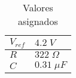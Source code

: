 %
%


\begin{comment}









\blfootnote{\textbf{\textit{Nota: }}Excelente formato de práctica, sin duda.}



\begin{Graphs}[H]
\centering
\texttt{[image: ./images/plotbat.eps]} 
\caption{Símbolo de Batman.}
\label{g1}
\end{Graphs}



\begin{esq}[H]
\centering
\texttt{[image: ./images/1.eps]} 
\caption{Sistema eléctrico procesado en TINA-TI.}
\label{e1}
\end{esq}




\begin{figure}[H]
\centering
\texttt{[image: ./images/a20.eps]} 
\caption{Pares ordenados para h = 2.}
\label{f1}
\end{figure}




\lstset{language=C, breaklines=true, basicstyle=\footnotesize}
\begin{lstlisting}[frame=single,caption={Código del método de la secante},label={c1}, captionpos=b]

línea 1
\end{lstlisting}
\end{comment}




\begin{table}[H]
  \centering
    \begin{tabular}{|l|l|}
    \hline
    $V_{ref}$   & $4.2\; V$ \bigstrut\\
    \hline
    $R$    & $322\; \Omega$ \bigstrut\\
    \hline
    $C$     & $0.31 \;\mu F$ \bigstrut\\
    \hline
    \end{tabular}%
     \caption{Valores asignados}
  \label{tab:addlabel}%
\end{table}%



